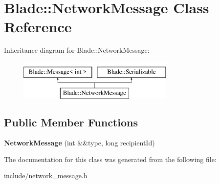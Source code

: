 \hypertarget{class_blade_1_1_network_message}{}\section{Blade\+:\+:Network\+Message Class Reference}
\label{class_blade_1_1_network_message}
Inheritance diagram for Blade\+:\+:Network\+Message\+:\begin{figure}[H]
\begin{center}
\leavevmode
\includegraphics[height=2.000000cm]{class_blade_1_1_network_message}
\end{center}
\end{figure}
\subsection*{Public Member Functions}
\begin{DoxyCompactItemize}
\item 
\mbox{\label{class_blade_1_1_network_message_a4711d53f8f0df27056b814b7eca31efc}} 
{\bfseries Network\+Message} (int \&\&type, long recipient\+Id)
\end{DoxyCompactItemize}


The documentation for this class was generated from the following file\+:\begin{DoxyCompactItemize}
\item 
include/network\+\_\+message.\+h\end{DoxyCompactItemize}
